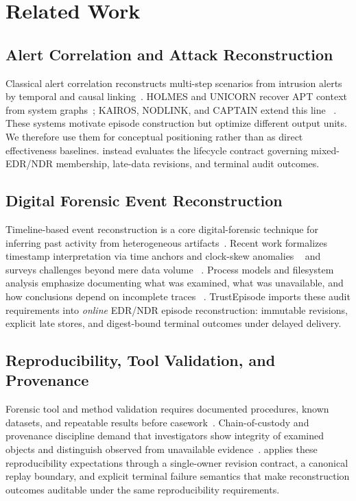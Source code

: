 \section{Related Work}
\label{sec:related}

\subsection{Alert Correlation and Attack Reconstruction}

Classical alert correlation reconstructs multi-step scenarios from intrusion alerts by temporal
and causal linking~\cite{ning2002attackscenarios}. HOLMES and UNICORN recover APT context from
system graphs~\cite{holmes2019,unicorn2020}; KAIROS, NODLINK, and CAPTAIN extend this line
~\cite{kairos2024,nodlink2024,captain2025}. These systems motivate episode construction but optimize different output units. We therefore
use them for conceptual positioning rather than as direct effectiveness baselines. \trustepisode
instead evaluates the lifecycle contract governing mixed-EDR/NDR membership, late-data revisions,
and terminal audit outcomes.

\subsection{Digital Forensic Event Reconstruction}

Timeline-based event reconstruction is a core digital-forensic technique for inferring past
activity from heterogeneous artifacts~\cite{breitinger2025sok,casey2011digitalevidence}. Recent
work formalizes timestamp interpretation via time anchors and clock-skew anomalies
~\cite{vanini2024timeanchors} and surveys challenges beyond mere data volume
~\cite{breitinger2025sok}. Process models and filesystem analysis emphasize documenting what was
examined, what was unavailable, and how conclusions depend on incomplete traces
~\cite{carrier2005filesystem,nist80086}. TrustEpisode imports these audit requirements into
\emph{online} EDR/NDR episode reconstruction: immutable revisions, explicit late stores, and
digest-bound terminal outcomes under delayed delivery.

\subsection{Reproducibility, Tool Validation, and Provenance}

Forensic tool and method validation requires documented procedures, known datasets, and
repeatable results before casework~\cite{swgde2018tooltesting,brunty2022validation,wales2026validation}.
Chain-of-custody and provenance discipline demand that investigators show integrity of examined
objects and distinguish observed from unavailable evidence~\cite{casey2011digitalevidence,nist80086}.
\trustepisode applies these reproducibility expectations through a single-owner revision contract,
a canonical replay boundary, and explicit terminal failure semantics that make reconstruction
outcomes auditable under the same reproducibility requirements.


